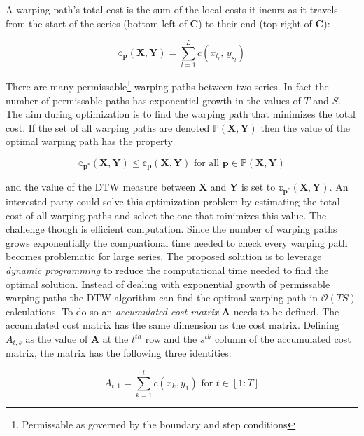 \documentclass[12pt]{article}
\begin{document}
A warping path's total cost is the sum of the local costs it incurs as it travels from the start of the series (bottom left of $\boldsymbol{C}$) to their end (top right of $\boldsymbol{C}$):

\begin{equation} \label{eq:dtw_cost_matrix_definition}
    \mathbb{c}_{\boldsymbol{p}}(\boldsymbol{X}, \boldsymbol{Y}) = \sum^{L}_{l=1} c(x_{t_{l}},\, y_{s_{l}})
\end{equation}

There are many permissable\footnote{Permissable as governed by the boundary and step conditions} warping paths between two series. In fact the number of permissable paths has exponential growth in the values of $T$ and $S$. The aim during optimization is to find the warping path that minimizes the total cost. If the set of all warping paths are denoted $\mathbb{P}(\boldsymbol{X}, \boldsymbol{Y})$ then the value of the optimal warping path has the property

\begin{equation}
    \mathbb{c}_{\boldsymbol{p}^{*}}(\boldsymbol{X}, \boldsymbol{Y}) \le \mathbb{c}_{\boldsymbol{p}}(\boldsymbol{X}, \boldsymbol{Y}) \,\, \textrm{for all} \,\, \boldsymbol{p} \in \mathbb{P}(\boldsymbol{X}, \boldsymbol{Y})
\end{equation}

and the value of the DTW measure between $\boldsymbol{X}$ and $\boldsymbol{Y}$ is set to $\mathbb{c}_{\boldsymbol{p^{*}}}(\boldsymbol{X}, \boldsymbol{Y})$. An interested party could solve this optimization problem by estimating the total cost of all warping paths and select the one that minimizes this value. The challenge though is efficient computation. Since the number of warping paths grows exponentially the compuational time needed to check every warping path becomes problematic for large series. The proposed solution is to leverage \emph{dynamic programming} to reduce the computational time needed to find the optimal solution. Instead of dealing with exponential growth of permissable warping paths the DTW algorithm can find the optimal warping path in $\mathcal{O}(TS)$ calculations. To do so an \emph{accumulated cost matrix} $\boldsymbol{A}$ needs to be defined. The accumulated cost matrix has the same dimension as the cost matrix. Defining $A_{t,s}$ as the value of $\boldsymbol{A}$ at the $t^{th}$ row and the $s^{th}$ column of the accumulated cost matrix, the matrix has the following three identities:

\begin{equation}
    A_{t,1} = \sum^{t}_{k=1} c(x_{k}, y_{1}) \,\, \textrm{for} \,\, t \in [1:T]
\end{equation}
\end{document}
